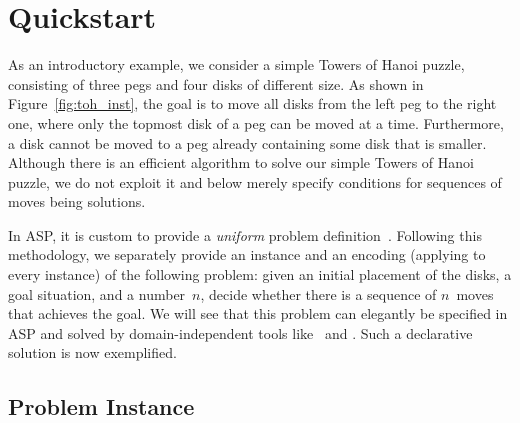 
\section{Quickstart}\label{sec:quickstart}


As an introductory example,
we consider a simple Towers of Hanoi puzzle,
consisting of
three pegs and four disks of different size.
As shown in Figure~\ref{fig:toh_inst},
the goal is to move all disks from the left peg to the right one,
where only the topmost disk of a peg can be moved at a time.
%
Furthermore, 
a disk cannot be moved to a peg already containing some disk that is smaller.
Although there is an efficient algorithm to solve our simple Towers of Hanoi puzzle,
we do not exploit it and below merely specify conditions for
sequences of moves being solutions.

In ASP, it is custom to provide a \emph{uniform}
problem definition~\cite{martru99a,niemela99a,schlipf95a}.
Following this methodology, we separately provide an instance and
an encoding (applying to every instance) of the following problem:
given an initial placement of the disks, a goal situation, and a number~$n$,
decide whether there is a sequence of $n$~moves 
that achieves the goal.
We will see that this problem can elegantly be  
specified in ASP and
solved by domain-independent tools like \gringo\ and \clasp.
Such a declarative solution is now exemplified.

\subsection{Problem Instance}

